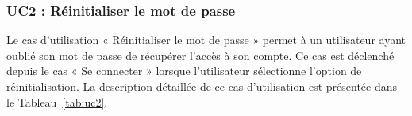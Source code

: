 
\vspace{-0.2cm}

\subsubsection{UC2 : Réinitialiser le mot de passe}

Le cas d’utilisation « Réinitialiser le mot de passe » permet à un utilisateur ayant oublié son mot de passe de récupérer l’accès à son compte. Ce cas est déclenché depuis le cas « Se connecter » lorsque l’utilisateur sélectionne l’option de réinitialisation. La description détaillée de ce cas d’utilisation est présentée dans le Tableau~\ref{tab:uc2}.

